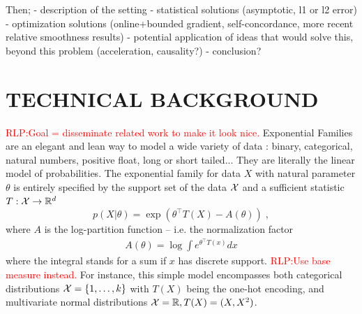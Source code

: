 \documentclass[twoside]{article}
\let\oldsection\section
\renewcommand{\section}[1]{\oldsection{\uppercase{#1}}}
\newcommand{\RLP}[1]{\textcolor{red}{RLP:#1}}
\newcommand{\logpart}{A}
\newcommand{\natp}{\theta}
\begin{document}
Then; 
- description of the setting
- statistical solutions (asymptotic, l1 or l2 error)
- optimization solutions (online+bounded gradient, self-concordance, more recent relative smoothness results)
- potential application of ideas that would solve this, beyond this problem (acceleration, causality?)
- conclusion?









\section{Technical background}

\RLP{Goal = disseminate related work to make it look nice.}
Exponential Families are an elegant and lean way to model a wide variety of data : binary, categorical, natural numbers, positive float, long or short tailed... 
They are literally the linear model of probabilities.
The exponential family for data $X$ with natural parameter $\natp$  is entirely specified by the support set of the data   ${\mathcal X}$ and a sufficient statistic $T: {\mathcal X} \rightarrow \mathbb{R}^d$
\begin{equation}
	 p(X|\natp) = \exp( \natp^\top T(X) - \logpart(\natp)) \; ,
\end{equation}
where $\logpart$ is the log-partition function -- i.e. the normalization factor
\begin{align}
    \logpart(\natp) = \log \int e^{\natp^\top T(x)} dx 
\end{align}
where the integral stands for a sum if $x$ has discrete support. \RLP{Use base measure instead.}
For instance, this simple model encompasses both categorical distributions ${\mathcal X} = \{1, \dots, k\}$ with $T(X)$ being the one-hot encoding, and multivariate normal distributions ${\mathcal X}=\mathbb{R}, T(X)=(X, X^2)$. 
\end{document}

